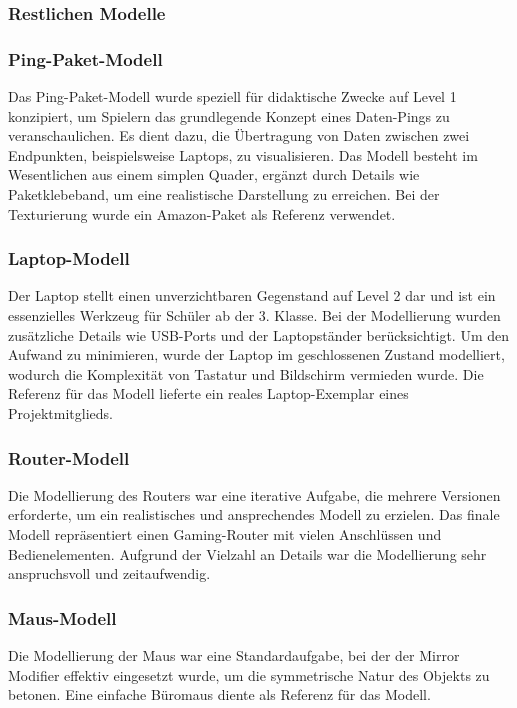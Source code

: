 
\subsubsection{Restlichen Modelle}
\subsubsection*{Ping-Paket-Modell}
Das Ping-Paket-Modell wurde speziell für didaktische Zwecke auf Level 1 konzipiert, um Spielern das grundlegende Konzept
eines Daten-Pings zu veranschaulichen. Es dient dazu, die Übertragung von Daten zwischen zwei Endpunkten, beispielsweise
Laptops, zu visualisieren. Das Modell besteht im Wesentlichen aus einem simplen Quader, ergänzt durch Details wie
Paketklebeband, um eine realistische Darstellung zu erreichen. Bei der Texturierung wurde ein Amazon-Paket als Referenz verwendet.

\subsubsection*{Laptop-Modell}
Der Laptop stellt einen unverzichtbaren Gegenstand auf Level 2 dar und ist ein essenzielles Werkzeug für Schüler ab der
3. Klasse. Bei der Modellierung wurden zusätzliche Details wie USB-Ports und der Laptopständer berücksichtigt. Um den
Aufwand zu minimieren, wurde der Laptop im geschlossenen Zustand modelliert, wodurch die Komplexität von Tastatur und
Bildschirm vermieden wurde. Die Referenz für das Modell lieferte ein reales Laptop-Exemplar eines Projektmitglieds.

\subsubsection*{Router-Modell}
Die Modellierung des Routers war eine iterative Aufgabe, die mehrere Versionen erforderte, um ein realistisches und
ansprechendes Modell zu erzielen. Das finale Modell repräsentiert einen Gaming-Router mit vielen Anschlüssen und Bedienelementen.
Aufgrund der Vielzahl an Details war die Modellierung sehr anspruchsvoll und zeitaufwendig.

\subsubsection*{Maus-Modell}
Die Modellierung der Maus war eine Standardaufgabe, bei der der Mirror Modifier effektiv eingesetzt wurde, um die
symmetrische Natur des Objekts zu betonen. Eine einfache Büromaus diente als Referenz für das Modell.

